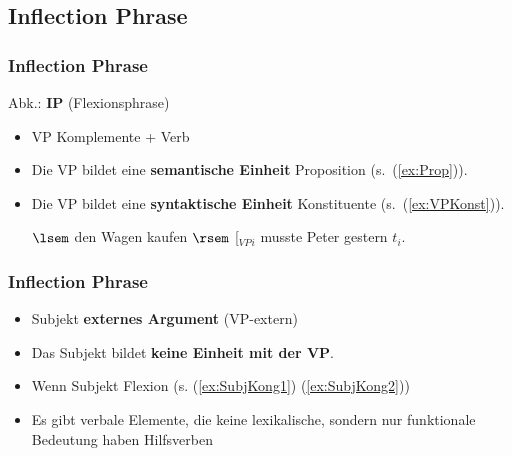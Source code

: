 \subsection{Inflection Phrase}

\begin{frame}
\frametitle{Inflection Phrase}

Abk.: \textbf{IP} (Flexionsphrase)

\begin{itemize}
	\item VP \ras Komplemente + Verb

	\item Die VP bildet eine \textbf{semantische Einheit} \ras Proposition (s.\ (\ref{ex:Prop})).

	\item Die VP bildet eine \textbf{syntaktische Einheit} \ras Konstituente (s.\ (\ref{ex:VPKonst})).

	\eal
	\ex\label{ex:Prop} $\lsem$ den Wagen kaufen $\rsem$
	\ex\label{ex:VPKonst} {[}$_{VP}$\alertred{Den Wagen kaufen}{]}$_{i}$ musste Peter gestern $t_i$. 
	\zl
	
\end{itemize}

\nocite{Fries&MyP16h}

\end{frame}



\begin{frame}
\frametitle{Inflection Phrase}

\begin{itemize}
		\item Subjekt \ras \textbf{externes Argument} (VP-extern)

		\item Das Subjekt bildet \textbf{keine Einheit mit der VP}.	

		\z

\pause

		\item Wenn Subjekt \ras Flexion	(s. (\ref{ex:SubjKong1}) \vs (\ref{ex:SubjKong2}))	

		\label{ex:SubjKong1}
			
		\label{ex:SubjKong2}
		\z
		
		\item Es gibt verbale Elemente, die keine lexikalische, sondern nur funktionale Bedeutung haben \ras Hilfsverben

\end{itemize}

\end{frame}


